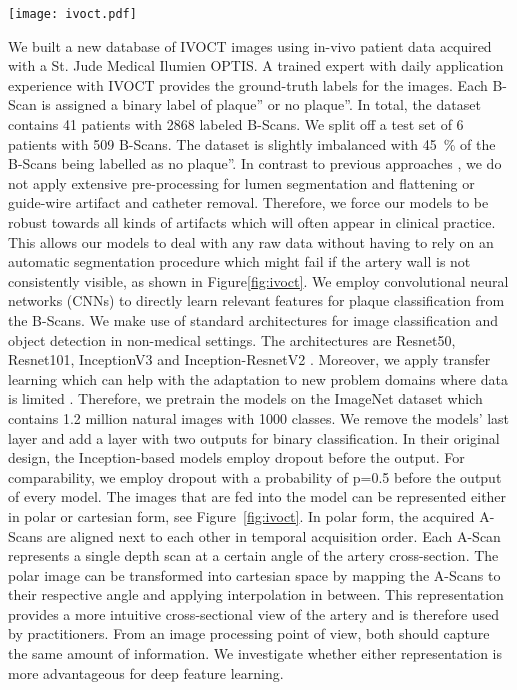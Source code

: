 \begin{figure*}
  \centering
  \texttt{[image: ivoct.pdf]}
\caption{Left, a cartesian IVOCT image is shown. Right, the polar image is shown. Note, that there are various artifacts in the vessel which impede a clear view of the vessel wall. Lipid-rich plaque is visible in this image. *’ denotes the guide-wire artifact.}
\label{fig:ivoct}       %
\end{figure*}

We built a new database of IVOCT images using in-vivo patient data acquired with a St. Jude Medical Ilumien OPTIS. A trained expert with daily application experience with IVOCT provides the ground-truth labels for the images. Each B-Scan is assigned a binary label of plaque” or no plaque”. In total, the dataset contains 41 patients with 2868 labeled B-Scans. We split off a test set of 6 patients with 509 B-Scans. The dataset is slightly imbalanced with \SI{45}{\percent} of the B-Scans being labelled as no plaque”.
In contrast to previous approaches \cite{ughi2013automated,rico2016automatic}, we do not apply extensive pre-processing for lumen segmentation and flattening or guide-wire artifact and catheter removal. Therefore, we force our models to be robust towards all kinds of artifacts which will often appear in clinical practice. This allows our models to deal with any raw data without having to rely on an automatic segmentation procedure which might fail if the artery wall is not consistently visible, as shown in Figure\ref{fig:ivoct}.
We employ convolutional neural networks (CNNs) to directly learn relevant features for plaque classification from the B-Scans.  We make use of standard architectures for image classification and object detection in non-medical settings. The architectures are Resnet50, Resnet101, InceptionV3 and Inception-ResnetV2 \cite{litjens2017survey,Szegedy.2017}. Moreover, we apply transfer learning which can help with the adaptation to new problem domains where data is limited \cite{ravishankar2016understanding}. Therefore, we pretrain the models on the ImageNet dataset which contains 1.2 million natural images with 1000 classes. We remove the models’ last layer and add a layer with two outputs for binary classification. In their original design, the Inception-based models employ dropout before the output. For comparability, we employ dropout with a probability of p=0.5 before the output of every model.
The images that are fed into the model can be represented either in polar or cartesian form, see Figure~\ref{fig:ivoct}. In polar form, the acquired A-Scans are aligned next to each other in temporal acquisition order. Each A-Scan represents a single depth scan at a certain angle of the artery cross-section. The polar image can be transformed into cartesian space by mapping the A-Scans to their respective angle and applying interpolation in between. This representation provides a more intuitive cross-sectional view of the artery and is therefore used by practitioners. From an image processing point of view, both should capture the same amount of information. We investigate whether either representation is more advantageous for deep feature learning.
